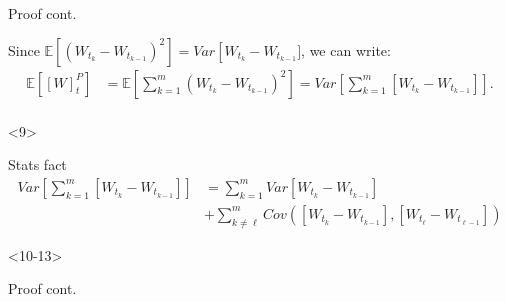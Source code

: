 \documentclass[10pt]{beamer}
\begin{document}
\begin{frame}[t]
\begin{onlyenv}
\begin{block}{Proof cont.}
{\begin{block}{}
            Since $\mathbb{E}[(W_{t_{k}} - W_{t_{k-1}})^2] = Var\left[W_{t_{k}} - W_{t_{k-1}}]$, we can write:
            \begin{align*}
              \mathbb{E}\left[[W]^{P}_{t}\right] &= \mathbb{E}\left[ \displaystyle\sum_{k = 1}^{m}(W_{t_k} - W_{t_{k-1}})^2 \right] = Var \left[\displaystyle\sum_{k = 1}^{m}\left[ W_{t_k} - W_{t_{k-1}} \right] \right]. \\
            \end{align*}
          \end{block}
        }
      \end{block}
    \end{onlyenv}
    \begin{onlyenv}<9>
      \begin{block}{Stats fact}
      \begin{align*}
        Var \left[\displaystyle\sum_{k = 1}^{m}\left[ W_{t_k} - W_{t_{k-1}} \right] \right] &= \displaystyle\sum_{k = 1}^{m}Var\left[ W_{t_k} - W_{t_{k-1}} \right] \\ 
        &+ \displaystyle\sum_{k \neq \ell}^{m}Cov\left(\left[ W_{t_k} - W_{t_{k-1}} \right], \left[ W_{t_{\ell}} - W_{t_{\ell-1}} \right]\right)
      \end{align*}
      \end{block}
    \end{onlyenv}
    \begin{onlyenv}<10-13>
      \begin{block}{Proof cont.}
      \onslide<11->{%
      Therefore, 
      \begin{align*}
        E\left[ \left[ W \right]^{P}_{t}] \right] = \displaystyle\sum_{k = 1}^{m}Var\left[ W_{t_{k}} - W_{t_{k-1}} \right]
      \end{align*}
      }
\end{block}
\end{onlyenv}
\end{frame}
\end{document}
